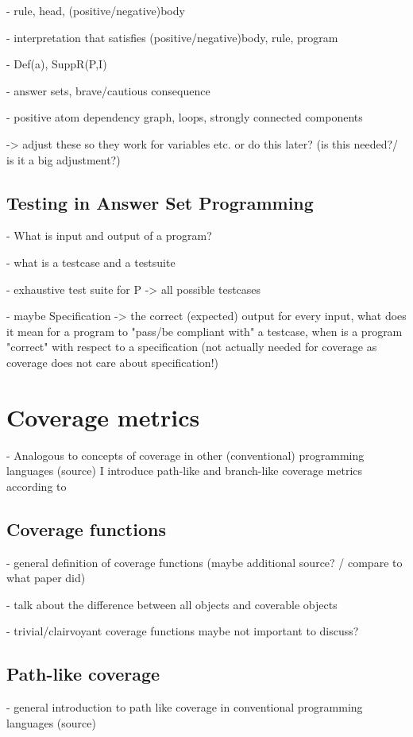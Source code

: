     - rule, head, (positive/negative)body
    
    - interpretation that satisfies (positive/negative)body, rule, program

    - Def(a), SuppR(P,I)

    - answer sets, brave/cautious consequence

    - positive atom dependency graph, loops, strongly connected components

-> adjust these so they work for variables etc. or do this later? (is this needed?/ is it a big adjustment?)

\section{Testing in Answer Set Programming}
\label{sec:Preliminaries/Testing in Answer Set Programming}
- What is input and output of a program?

- what is a testcase and a testsuite

- exhaustive test suite for P -> all possible testcases

- maybe Specification -> the correct (expected) output for every input, what does it mean for a program to "pass/be compliant 
with" a testcase, when is a program "correct" with respect to a specification (not actually needed for coverage as coverage 
does not care about specification!)

\chapter{Coverage metrics}
\label{ch:Coverage metrics}
- Analogous to concepts of coverage in other (conventional) programming languages (source) I introduce path-like and branch-like coverage
metrics according to \textcite{Jan+10}

\section{Coverage functions}
\label{sec:Coverage metrics/Coverage functions}
- general definition of coverage functions (maybe additional source? / compare to what paper did)

- talk about the difference between all objects and coverable objects

- trivial/clairvoyant coverage functions maybe not important to discuss?

\section{Path-like coverage}
\label{sec:Coverage metrics/Path-like coverage}
- general introduction to path like coverage in conventional programming languages (source)

